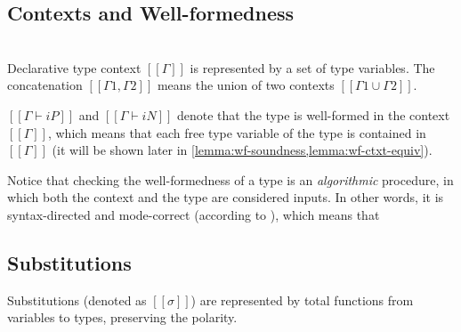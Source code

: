 \documentclass[acmsmall,natbib=false,review,anonymous]{acmart}
\begin{document}
\subsection{Contexts and Well-formedness}

\begin{definition}
  \hfill \\
  Declarative type context $[[Γ]]$ is represented by a set of 
  type variables. The concatenation $[[Γ1, Γ2]]$ means the 
  union of two contexts $[[Γ1 ∪ Γ2]]$.
\end{definition}

$[[Γ ⊢ iP]]$ and $[[Γ ⊢ iN]]$ denote that the type is well-formed in the context $[[Γ]]$,
which means that each free type variable of the type is contained in $[[Γ]]$
(it will be shown later in \cref{lemma:wf-soundness,lemma:wf-ctxt-equiv}).

Notice that checking the well-formedness of a type
is an \emph{algorithmic} procedure, in which 
both the context and the type are considered inputs.
In other words, it is syntax-directed and mode-correct 
(according to \cite{dunfieldBidirectionalTyping2020}), 
which means that 

\begin{algorithm}
  \label{alg:wf}
  \hfill
  
  \begin{multicols}{2}
  \ottdefnWFTNiWFLabeled{}
  \columnbreak

  \ottdefnWFTPiWFLabeled{}
  \end{multicols}

\end{algorithm}


\subsection{Substitutions}

\begin{definition}[Substitution]
  Substitutions (denoted as $[[σ]]$) 
  are represented by total functions from variables to types, preserving the polarity. 
\end{definition}
\end{document}
